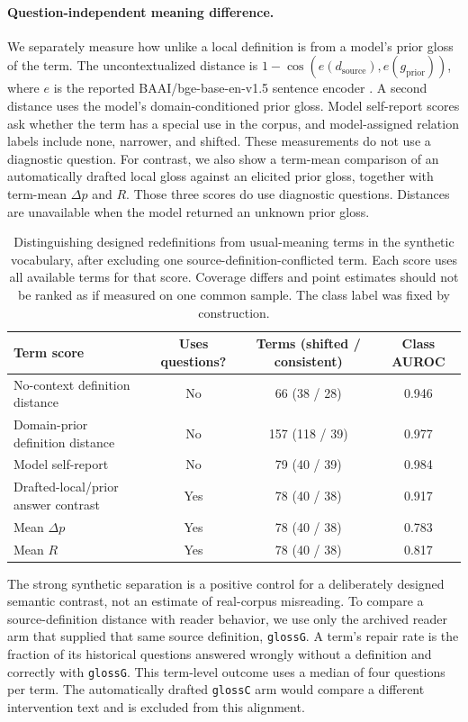 \paragraph{Question-independent meaning difference.}\label{app:meaning-difference}
We separately measure how unlike a local definition is from a model's prior gloss of the term. The uncontextualized distance is $1-\cos(e(d_{\mathrm{source}}),e(g_{\mathrm{prior}}))$, where $e$ is the reported BAAI/bge-base-en-v1.5 sentence encoder \citep{bge}. A second distance uses the model's domain-conditioned prior gloss. Model self-report scores ask whether the term has a special use in the corpus, and model-assigned relation labels include none, narrower, and shifted. These measurements do not use a diagnostic question. For contrast, we also show a term-mean comparison of an automatically drafted local gloss against an elicited prior gloss, together with term-mean $\Delta p$ and $R$. Those three scores do use diagnostic questions. Distances are unavailable when the model returned an unknown prior gloss.

\begin{table}[h]\centering\small
\caption{Distinguishing designed redefinitions from usual-meaning terms in the synthetic vocabulary, after excluding one source-definition-conflicted term. Each score uses all available terms for that score. Coverage differs and point estimates should not be ranked as if measured on one common sample. The class label was fixed by construction.}
\label{tab:term-difference-synthetic}
\begin{tabular}{@{}lccc@{}}\toprule
Term score & Uses questions? & Terms (shifted / consistent) & Class AUROC\\\midrule
No-context definition distance & No & 66 (38 / 28) & 0.946\\
Domain-prior definition distance & No & 157 (118 / 39) & 0.977\\
Model self-report & No & 79 (40 / 39) & 0.984\\
Drafted-local/prior answer contrast & Yes & 78 (40 / 38) & 0.917\\
Mean $\Delta p$ & Yes & 78 (40 / 38) & 0.783\\
Mean $R$ & Yes & 78 (40 / 38) & 0.817\\\bottomrule
\end{tabular}
\end{table}

The strong synthetic separation is a positive control for a deliberately designed semantic contrast, not an estimate of real-corpus misreading. To compare a source-definition distance with reader behavior, we use only the archived reader arm that supplied that same source definition, \texttt{glossG}. A term's repair rate is the fraction of its historical questions answered wrongly without a definition and correctly with \texttt{glossG}. This term-level outcome uses a median of four questions per term. The automatically drafted \texttt{glossC} arm would compare a different intervention text and is excluded from this alignment.

